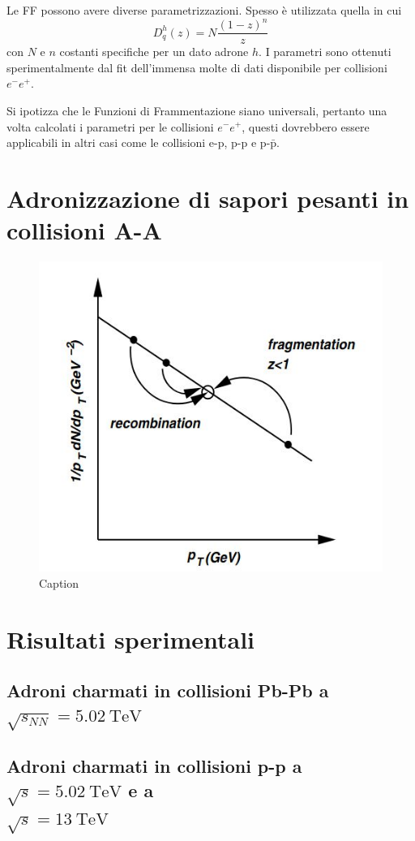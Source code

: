         Le FF possono avere diverse parametrizzazioni. Spesso è utilizzata quella in cui
        \begin{equation*}
            D_{q}^{h}(z) = N \frac{(1-z)^n}{z}
        \end{equation*}
        con $N$ e $n$ costanti specifiche per un dato adrone $h$. I parametri sono ottenuti sperimentalmente dal fit dell'immensa molte di dati disponibile per collisioni $e^{-} e^{+}$.

        Si ipotizza che le Funzioni di Frammentazione siano universali, pertanto una volta calcolati i parametri per le collisioni $e^{-} e^{+}$, questi dovrebbero essere applicabili in altri casi come le collisioni e-p, p-p e p-$\mathrm{\bar{p}}$.

\section{Adronizzazione di sapori pesanti in collisioni A-A}
    

    \begin{figure}
        \centering
        \includegraphics[width=0.5\linewidth]{res/fig/1-chapter/7-fragm-recom.jpg}
        \caption{Caption}
        \label{fig:7-fragm-recom}
    \end{figure}

\newpage

\section{Risultati sperimentali}

    \subsection{Adroni charmati in collisioni Pb-Pb a $\sqrt{s_{NN}} = \qty{5.02}{\tera \eV}$}

    \subsection{Adroni charmati in collisioni p-p a $\sqrt{s} = \qty{5.02}{\tera \eV}$ e a \\ $\sqrt{s} = \qty{13}{\tera \eV}$}